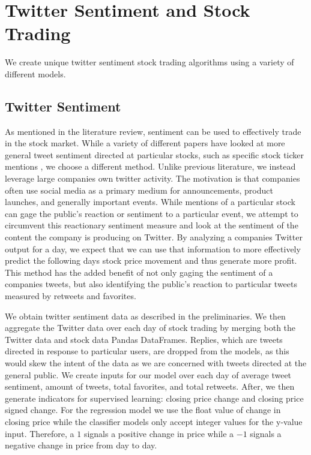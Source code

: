 \documentclass[../thesis.tex]{subfiles}
\begin{document}
\chapter{Twitter Sentiment and Stock Trading}
\label{ch:pruning}

We create unique twitter sentiment stock trading algorithms using a variety of different models. 

\section{Twitter Sentiment}

As mentioned in the literature review, sentiment can be used to effectively trade in the stock market. While a variety of different papers have looked at more general tweet sentiment directed at particular stocks, such as specific stock ticker mentions \cite{Mao2013}, we choose a different method. Unlike previous literature, we instead leverage large companies own twitter activity. The motivation is that companies often use social media as a primary medium for announcements, product launches, and generally important events. While mentions of a particular stock can gage the public's reaction or sentiment to a particular event, we attempt to circumvent this reactionary sentiment measure and look at the sentiment of the content the company is producing on Twitter. By analyzing a companies Twitter output for a day, we expect that we can use that information to more effectively predict the following days stock price movement and thus generate more profit. This method has the added benefit of not only gaging the sentiment of a companies tweets, but also identifying the public's reaction to particular tweets measured by retweets and favorites. 

We obtain twitter sentiment data as described in the preliminaries. We then aggregate the Twitter data over each day of stock trading by merging both the Twitter data and stock data Pandas DataFrames. Replies, which are tweets directed in response to particular users, are dropped from the models, as this would skew the intent of the data as we are concerned with tweets directed at the general public. We create inputs for our model over each day of average tweet sentiment, amount of tweets, total favorites, and total retweets. After, we then generate indicators for supervised learning: closing price change and closing price signed change. For the regression model we use the float value of change in closing price while the classifier models only accept integer values for the y-value input. Therefore, a $1$ signals a positive change in price while a $-1$ signals a negative change in price from day to day.  
\end{document}
